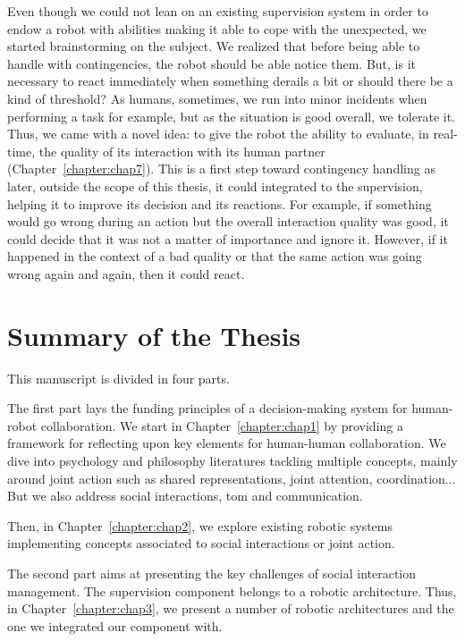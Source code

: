 \documentclass[a4paper,11pt,twoside]{StyleThese}
\begin{document}
Even though we could not lean on an existing supervision system in order to endow a robot with abilities making it able to cope with the unexpected, we started brainstorming on the subject. We realized that before being able to handle with contingencies, the robot should be able notice them. But, is it necessary to react immediately when something derails a bit or should there be a kind of threshold? As humans, sometimes, we run into minor incidents when performing a task for example, but as the situation is good overall, we tolerate it. Thus, we came with a novel idea: to give the robot the ability to evaluate, in real-time, the quality of its interaction with its human partner (Chapter~\ref{chapter:chap7}). This is a first step toward contingency handling as later, outside the scope of this thesis, it could integrated to the supervision, helping it to improve its decision and its reactions. For example, if something would go wrong during an action but the overall interaction quality was good, it could decide that it was not a matter of importance and ignore it. However, if it happened in the context of a bad quality or that the same action was going wrong again and again, then it could react.

\section*{Summary of the Thesis}

This manuscript is divided in four parts. 

The first part lays the funding principles of a decision-making system for human-robot collaboration. We start in Chapter~\ref{chapter:chap1} by providing a framework for reflecting upon key elements for human-human collaboration. We dive into psychology and philosophy literatures tackling multiple concepts, mainly around joint action such as shared representations, joint attention, coordination... But we also address social interactions, \acrlong{tom} and communication. 

Then, in Chapter~\ref{chapter:chap2}, we explore existing robotic systems implementing concepts associated to social interactions or joint action.

\bigskip 

The second part aims at presenting the key challenges of social interaction management. The supervision component belongs to a robotic architecture. Thus, in Chapter~\ref{chapter:chap3}, we present a number of robotic architectures and the one we integrated our component with. 
\end{document}
